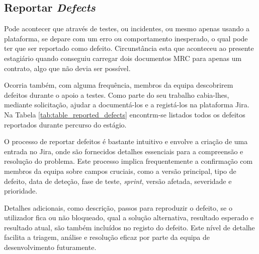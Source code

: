     \subsection{Reportar \textit{Defects}}\label{sub:reportar_defects}

        Pode acontecer que através de testes, ou incidentes, ou mesmo apenas usando a plataforma, se depare com um erro ou comportamento inesperado, o qual pode ter que ser reportado como defeito. Circunstância esta que aconteceu ao presente estagiário quando conseguiu carregar dois documentos MRC para apenas um contrato, algo que não devia ser possível. 
        
        Ocorria também, com alguma frequência, membros da equipa descobrirem defeitos durante o apoio a testes. Como parte do seu trabalho cabia-lhes, mediante solicitação,  
        ajudar a documentá-los e a registá-los na plataforma Jira. Na Tabela \ref{tab:table_reported_defects} encontrm-se listados todos os defeitos reportados durante percurso do estágio.

        O processo de reportar defeitos é bastante intuitivo e envolve a criação de uma entrada no Jira, onde são fornecidos detalhes essenciais para a compreensão e resolução do problema. Este processo implica frequentemente a confirmação com membros da equipa sobre campos cruciais, como a versão principal, tipo de defeito, data de deteção, fase de teste, \textit{sprint}, versão afetada, severidade e prioridade.

        Detalhes adicionais, como descrição, passos para reproduzir o defeito, se o utilizador fica ou não bloqueado, qual a solução alternativa, resultado esperado e resultado atual, são também incluídos no registo do defeito. Este nível de detalhe facilita a triagem, análise e resolução eficaz por parte da equipa de desenvolvimento futuramente.


